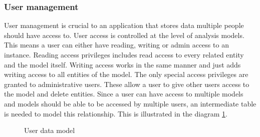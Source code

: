 \newpage
\subsubsection{User management}

User management is crucial to an application that stores data multiple people should have access to. User access is controlled at the level of analysis models. This means a user can either have reading, writing or admin access to an  instance. Reading access privileges includes read access to every related entity and the model itself. Writing access works in the same manner and just adds writing access to all entities of the model. The only special access privileges are granted to administrative users. These allow a user to give other users access to the model and delete entities. Since a user can have access to multiple models and models should be able to be accessed by multiple users, an intermediate table is needed to model this relationship. This is illustrated in the diagram \ref{fig:user-model}.

\begin{figure}
    \centering
    
    \caption{User data model}
    \label{fig:user-model}
    
\end{figure}

